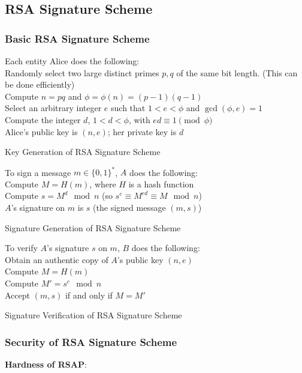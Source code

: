 \documentclass[12pt,titlepage]{article}
\begin{document}
\subsection{RSA Signature Scheme}
\subsubsection{Basic RSA Signature Scheme}
\newpage
\begin{algorithm}
	Each entity Alice does the following: \\
	Randomly select two large distinct primes $p, q$ of the same bit length. (This can be done efficiently)\\
	Compute $n = pq$ and $\phi = \phi(n) = (p-1)(q-1)$\\
	Select an arbitrary integer $e$ such that $1 < e < \phi$ and $\gcd(\phi, e) = 1$\\
	Compute the integer $d$, $1 < d < \phi$, with $ed \equiv 1 \pmod \phi$\\
	Alice's public key is $(n, e)$; her private key is $d$
	\caption{Key Generation of RSA Signature Scheme}
\end{algorithm}

\begin{algorithm}
	To sign a message $m \in \{0,1\}^*$, $A$ does the following: \\
	Compute $M = H(m)$, where $H$ is a hash function\\
	Compute $s = M^d \mod n$ (so $s^e \equiv M^{ed} \equiv M \mod n$)\\
	$A$'s signature on $m$ is $s$ (the signed message $(m, s)$)
	\caption{Signature Generation of RSA Signature Scheme}
\end{algorithm}

\begin{algorithm}
	To verify $A$'s signature $s$ on $m$, $B$ does the following: \\
	Obtain an authentic copy of $A$'s public key $(n, e)$\\
	Compute $M = H(m)$\\
	Compute $M' = s^e \mod n$\\
	Accept $(m,s)$ if and only if $M = M'$
	\caption{Signature Verification of RSA Signature Scheme}
\end{algorithm}
\subsubsection{Security of RSA Signature Scheme}
\textbf{Hardness of RSAP}: 
\end{document}

